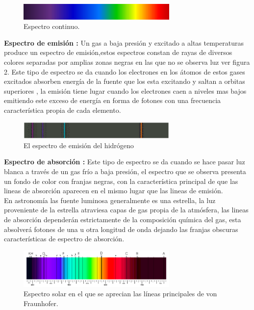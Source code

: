 \begin{figure}[htb!]
\centering
\includegraphics[width=0.7\textwidth]{images/1.png}
\caption[Espectro continuo.]{Espectro continuo.\cite{libro}}
 \label{fig2}
\end{figure}

\textbf{Espectro de emisión :} Un gas a baja presión y excitado a altas temperaturas produce un espectro de emisión,estos espectros constan de rayas de diversos colores separadas por amplias zonas  negras en las que no se observa luz ver figura 2. Este tipo de espectro se da cuando los electrones en los átomos de estos gases excitados absorben energía de la fuente que los esta excitando  y saltan a orbitas superiores , la emisión tiene lugar cuando los electrones caen a niveles mas bajos emitiendo este exceso de energía en forma de fotones con una frecuencia característica propia de cada elemento.


 \begin{figure}[htb!]
\centering
\includegraphics[width=0.7\textwidth]{images/2.png}
\caption[Descripción versión comprimida]{El espectro de emisión del hidrógeno \cite{articulo1}}
 \label{fig3}
\end{figure}


\textbf{Espectro de absorción :} Este tipo de espectro se da cuando se hace pasar luz blanca a través de un gas frío a baja presión, el espectro que se observa presenta un fondo de color con franjas negras, con la característica principal de que las lineas de absorción aparecen en el mismo lugar que las lineas de emisión.\\
En astronomía las fuente luminosa generalmente es una estrella, la luz proveniente de la estrella atraviesa capas de gas propia de la atmósfera, las lineas de absorción dependerán estrictamente de la composición química del gas, esta absolverá fotones de una u otra longitud de onda dejando las franjas obscuras características de espectro de absorción.


\begin{figure}[htb!]
\centering
\includegraphics[width=0.7\textwidth]{images/3.png}
\caption[Descripción versión comprimida]{Espectro solar en el que se aprecian las líneas principales de von Fraunhofer. \cite{articulo1}}
 \label{fig4}
\end{figure}

